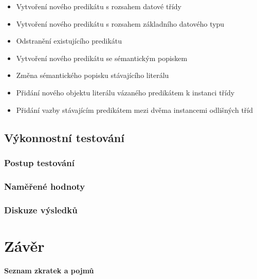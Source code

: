 \documentclass{projekt}
\begin{document}
\begin{itemize}
\vspace{0.45cm}
\item Vytvoření nového predikátu s rozsahem datové třídy
\item Vytvoření nového predikátu s rozsahem základního datového typu
\item Odstranění existujícího predikátu
\item Vytvoření nového predikátu se sémantickým popiskem
\item Změna sémantického popisku stávajícího literálu
\item Přidání nového objektu literálu vázaného predikátem k instanci třídy
\item Přidání vazby stávajícím predikátem mezi dvěma instancemi odlišných tříd
\end{itemize}




\section{Výkonnostní testování}
\subsection{Postup testování}
\subsection{Naměřené hodnoty}
\subsection{Diskuze výsledků}


\chapter{Závěr}


\newpage
\thispagestyle{plain}
\noindent
{\bf \LARGE Seznam zkratek a pojmů}\\
\end{document}
